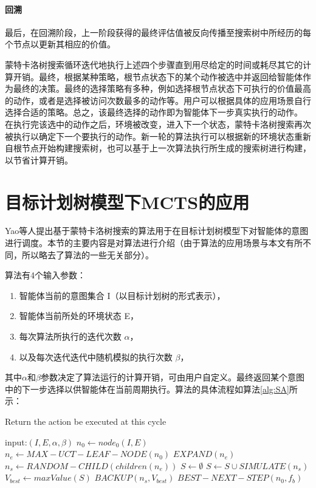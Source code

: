\paragraph{回溯}
最后，在回溯阶段，上一阶段获得的最终评估值被反向传播至搜索树中所经历的每个节点以更新其相应的价值。

蒙特卡洛树搜索循环迭代地执行上述四个步骤直到用尽给定的时间或耗尽其它的计算开销。最终，根据某种策略，根节点状态下的某个动作被选中并返回给智能体作为最终的决策。最终的选择策略有多种，例如选择根节点状态下可执行的价值最高的动作，或者是选择被访问次数最多的动作等。用户可以根据具体的应用场景自行选择合适的策略。总之，该最终选择的动作即为智能体下一步真实执行的动作。
%
在执行完该选中的动作之后，环境被改变，进入下一个状态，蒙特卡洛树搜索再次被执行以确定下一个要执行的动作。新一轮的算法执行可以根据新的环境状态重新自根节点开始构建搜索树，也可以基于上一次算法执行所生成的搜索树进行构建，以节省计算开销。


\section{目标计划树模型下MCTS的应用}\label{SA}
Yao等人提出基于蒙特卡洛树搜索的\SA \cite{DBLP:conf/atal/YaoL16}算法用于在目标计划树模型下对智能体的意图进行调度。本节的主要内容是对\SA 算法进行介绍（由于\SA 算法的应用场景与本文有所不同，所以略去了算法的一些无关部分）。

\SA 算法有4个输入参数：
\begin{enumerate}
  \item 智能体当前的意图集合 I（以目标计划树的形式表示），
  \item 智能体当前所处的环境状态 E，
  \item 每次算法所执行的迭代次数 $\alpha$， 
  \item 以及每次迭代迭代中随机模拟的执行次数 $\beta$，
\end{enumerate}
其中$\alpha$和$\beta$参数决定了算法运行的计算开销，可由用户自定义。\SA 最终返回某个意图中的下一步选择以供智能体在当前周期执行。\SA 算法的具体流程如算法\ref{alg:SA}所示：

\begin{algorithm}
\caption{Return the action be executed at this cycle}\label{alg:SA}
  \begin{algorithmic}[1]
    \STATE input:$(I, E,\alpha,\beta)$
    \STATE $n_0 \gets node_0(I,E)$ \label{root}
     \label{iteration begin}
      \STATE $n_e \gets MAX-UCT-LEAF-NODE(n_0)$ \label{selection}
      \STATE $EXPAND(n_e)$ \label{expansion}
      \STATE $n_s \gets RANDOM-CHILD(children(n_e))$ \label{simulation begin}
      \STATE $S \gets \emptyset$
        \STATE $S \gets S \cup SIMULATE(n_s)$
      \ENDFOR \label{simulation end}
      \STATE $V_{best} \gets maxValue(S)$
      \STATE $BACKUP(n_s, V_{best})$ \label{back}
      \ENDFOR \label{iteration end}
      \STATE \RETURN $BEST-NEXT-STEP(n_0, f_b)$
  \end{algorithmic}
\end{algorithm}

